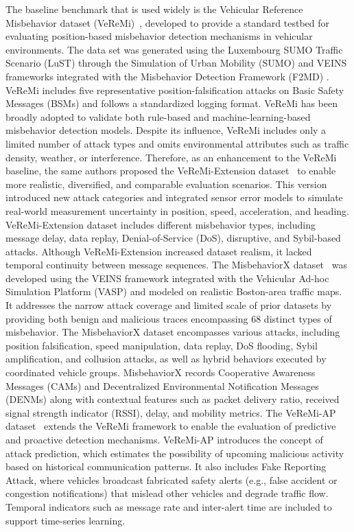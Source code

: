 \documentclass[journal,comsoc]{IEEEtran}
\begin{document}
The baseline benchmark that is used widely is the Vehicular Reference Misbehavior dataset (VeReMi)~\cite{Kamel2020}, developed to provide a standard testbed for evaluating position-based misbehavior detection mechanisms in vehicular environments. The data set was generated using the Luxembourg SUMO Traffic Scenario (LuST) \cite{7385539} through the Simulation of Urban Mobility (SUMO) \cite {Krajzewicz_SUMO_2012}and VEINS frameworks \cite{Sommer_Veins_2011} integrated with the Misbehavior Detection Framework (F2MD) \cite{Kamel_F2MD_2020}. 
VeReMi includes five representative position-falsification attacks on Basic Safety Messages (BSMs) and follows a standardized logging format. 
VeReMi has been broadly adopted to validate both rule-based and machine-learning-based misbehavior detection models. 
Despite its influence, VeReMi includes only a limited number of attack types and omits environmental attributes such as traffic density, weather, or interference.
Therefore, as an enhancement to the VeReMi baseline, the same authors proposed the VeReMi-Extension dataset~\cite{Kamel2021} to enable more realistic, diversified, and comparable evaluation scenarios. 
This version introduced new attack categories and integrated sensor error models to simulate real-world measurement uncertainty in position, speed, acceleration, and heading. VeReMi-Extension dataset includes different misbehavior types, including message delay, data replay, Denial-of-Service (DoS), disruptive, and Sybil-based attacks. 
Although VeReMi-Extension increased dataset realism, it lacked temporal continuity between message sequences.
The MisbehaviorX dataset~\cite{MisbehaviorX2023} was developed using the VEINS framework integrated with the Vehicular Ad-hoc Simulation Platform (VASP) and modeled on realistic Boston-area traffic maps. 
It addresses the narrow attack coverage and limited scale of prior datasets by providing both benign and malicious traces encompassing 68 distinct types of misbehavior. The MisbehaviorX dataset encompasses various attacks, including position falsification, speed manipulation, data replay, DoS flooding, Sybil amplification, and collusion attacks, as well as hybrid behaviors executed by coordinated vehicle groups. 
MisbehaviorX records Cooperative Awareness Messages (CAMs) and Decentralized Environmental Notification Messages (DENMs) along with contextual features such as packet delivery ratio, received signal strength indicator (RSSI), delay, and mobility metrics. 
The VeReMi-AP dataset~\cite{Kamel2023} extends the VeReMi framework to enable the evaluation of predictive and proactive detection mechanisms. VeReMi-AP introduces the concept of attack prediction, which estimates the possibility of upcoming malicious activity based on historical communication patterns. It also includes Fake Reporting Attack, where vehicles broadcast fabricated safety alerts (e.g., false accident or congestion notifications) that mislead other vehicles and degrade traffic flow. Temporal indicators such as message rate and inter-alert time are included to support time-series learning. 
\end{document}
